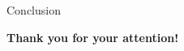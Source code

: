 \documentclass{beamer}
\begin{document}
	
	
	
	
	
	
	

\begin{frame}{Conclusion}
		
	

	\Huge \textbf{Thank you for your attention!}
\end{frame}
\end{document}
